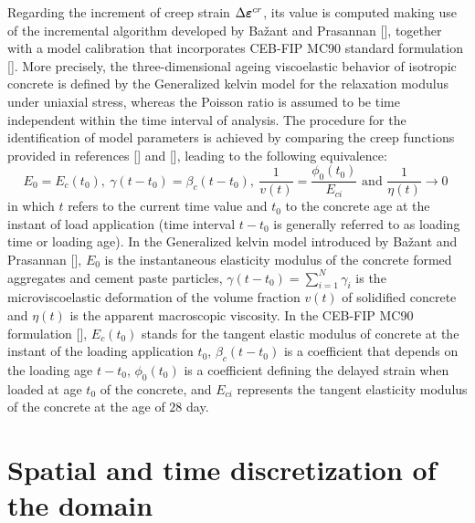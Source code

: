 \documentclass[a4paper,fleqn]{cas-sc}
\begin{document}
Regarding the increment of creep strain $\Delta \boldsymbol{\varepsilon}^{cr}$, its value is computed making use of the incremental algorithm developed by Bažant and Prasannan [], together with a model calibration that incorporates CEB-FIP MC90 standard formulation []. More precisely, the three-dimensional ageing viscoelastic behavior of isotropic concrete is defined by the Generalized kelvin model for the relaxation modulus under uniaxial stress, whereas the Poisson ratio is assumed to be time independent within the time interval of analysis. The procedure for the identification of model parameters is achieved by comparing the creep functions provided in references [] and [], leading to the following equivalence:
\begin{equation} \label{eq:11}
	E_0 = E_c(t_0),~ \gamma(t-t_0)=\beta_c(t-t_0),~ \frac{1}{v(t)} = \frac{\phi_0(t_0)}{E_{ci}} \text{  and  } \frac{1}{\eta(t)} \to 0 \;
\end{equation}
in which $t$ refers to the current time value and $t_0$ to the concrete age at the instant of load application (time interval $t-t_0$ is generally referred to as loading time or loading age). In the Generalized kelvin model introduced by Bažant and Prasannan [], $E_0$ is the instantaneous elasticity modulus of the concrete formed aggregates and cement paste particles, $\gamma(t-t_0) = \sum\limits_{i=1}^{N}\gamma_i$ is the microviscoelastic deformation of the volume fraction $v(t)$ of solidified concrete and $\eta(t)$ is the apparent macroscopic viscosity. In the CEB-FIP MC90 formulation [], $E_c(t_0)$ stands for the tangent elastic modulus of concrete at the instant of the loading application $t_0$, $\beta_c(t-t_0)$ is a coefficient that depends on the loading age $t-t_0$, $\phi_0(t_0)$ is a coefficient defining the delayed strain when loaded at age $t_0$ of the concrete, and $E_{ci}$ represents the tangent elasticity modulus of the concrete at the age of $28$ day.

\section{Spatial and time discretization of the domain}\label{section_spatial}
\end{document}

